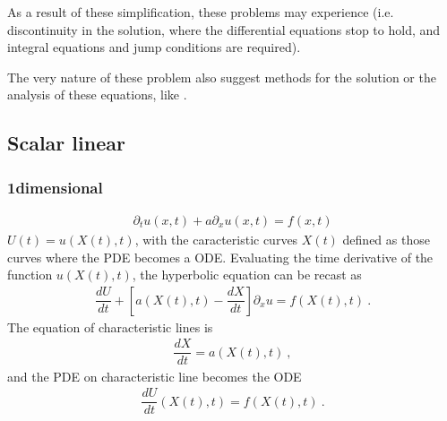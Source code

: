 \documentclass[letterpaper,10pt,english]{jupyterBook}
\begin{document}
\sphinxAtStartPar
As a result of these simplification, these problems may experience  (i.e. discontinuity in the solution, where the differential equations stop to hold, and integral equations and jump conditions are required).  

\sphinxAtStartPar
The very nature of these problem also suggest methods for the solution or the analysis of these equations, like .


\subsection{Scalar linear}
\label{\detokenize{ch/pde/hyperbolic-dimensions:scalar-linear}}\label{\detokenize{ch/pde/hyperbolic-dimensions:pde-hyperbolic-scalar-linear}}

\subsubsection{1\sphinxhyphen{}dimensional}
\label{\detokenize{ch/pde/hyperbolic-dimensions:dimensional}}\begin{equation*}
\begin{split}\partial_t u(x,t) + a \partial_x u(x,t) = f(x,t)\end{split}
\end{equation*}
\sphinxAtStartPar
{} \(U(t) = u(X(t), t)\), with the caracteristic curves \(X(t)\) defined as those curves where the PDE becomes a ODE. Evaluating the time derivative of the function \(u(X(t),t)\), the hyperbolic equation can be recast as
\begin{equation*}
\begin{split}\dfrac{d U}{dt} + \left[ a(X(t),t) - \dfrac{d X}{d t} \right] \partial_x u = f(X(t),t) \ .\end{split}
\end{equation*}
\sphinxAtStartPar
The equation of characteristic lines is
\begin{equation*}
\begin{split}\dfrac{d X}{d t} = a(X(t), t) \ ,\end{split}
\end{equation*}
\sphinxAtStartPar
and the PDE on characteristic line becomes the ODE
\begin{equation*}
\begin{split}\dfrac{d U}{d t}(X(t), t) = f(X(t), t) \ .\end{split}
\end{equation*}
\end{document}
